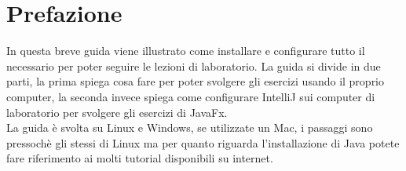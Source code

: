 \chapter*{Prefazione}
    In questa breve guida viene illustrato come installare e configurare tutto il necessario per poter seguire le lezioni di laboratorio.
    La guida si divide in due parti, la prima spiega cosa fare per poter svolgere gli esercizi usando il proprio computer, la seconda invece
    spiega come configurare IntelliJ sui computer di laboratorio per svolgere gli esercizi di JavaFx.\\
    La guida è svolta su Linux e Windows, se utilizzate un Mac, i passaggi sono pressochè gli stessi di Linux ma per quanto riguarda l'installazione
    di Java potete fare riferimento ai molti tutorial disponibili su internet.
